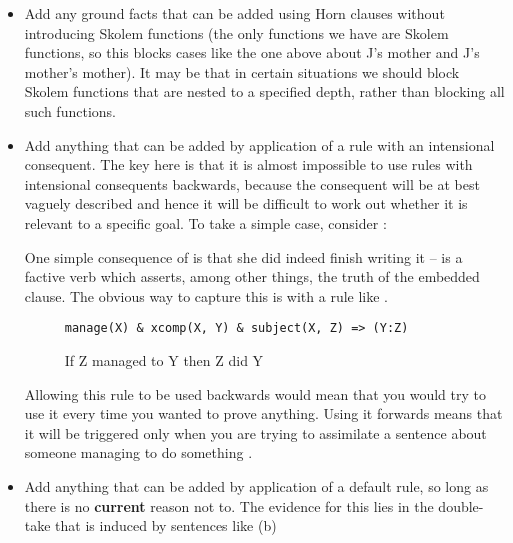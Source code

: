 \documentclass[11pt,a4paper]{article}
\begin{document}
\begin{itemize}
\item
Add any ground facts that can be added using Horn clauses without
introducing Skolem functions (the only functions we have are Skolem
functions, so this blocks cases like the one above about J's mother
and J's mother's mother). It may be that in certain situations we
should block Skolem functions that are nested to a specified depth,
rather than blocking all such functions.
\item
Add anything that can be added by application of a rule with an
intensional consequent. The key here is that it is almost impossible
to use rules with intensional consequents backwards, because the
consequent will be at best vaguely described and hence it will be
difficult to work out whether it is relevant to a specific goal. To
take a simple case, consider :


One simple consequence of  is that she did indeed
finish writing it --  is a factive verb which asserts, among
other things, the truth of the embedded clause. The obvious way to
capture this is with a rule like .

\begin{figure}[ht!]
\hspace{1.0in}
\begin{minipage}[t]{\linewidth}
\begin{Verbatim}[commandchars=\\\{\}]
manage(X) & xcomp(X, Y) & subject(X, Z) => (Y:Z)
\end{Verbatim}
\end{minipage}
\caption{If Z managed to Y then Z did Y}\label{R:MANAGE}
\end{figure}

\noindent
Allowing this rule to be used backwards would mean that you would try
to use it every time you wanted to prove anything. Using it forwards
means that it will be triggered only when you are trying to assimilate
a sentence about someone managing to do something \citep{Ramsay:01b}.

\item
Add anything that can be added by application of a default rule, so
long as there is no \textbf{current} reason not to. The evidence for
this lies in the double-take that is induced by sentences like
(b) 


\end{itemize}
\end{document}
